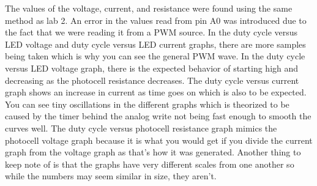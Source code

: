 \documentclass[12pt,titlepage]{article}
\begin{document}
The values of the voltage, current, and resistance were found using the same method as lab 2. An error in the values read from pin A0 was introduced due to
the fact that we were reading it from a PWM source. In the duty cycle versus LED voltage and duty cycle versus LED
current graphs, there are more samples being taken which is why you can see the general PWM wave. In the duty cycle versus LED voltage graph, there is the expected behavior of
starting high and decreasing as the photocell resistance decreases. The duty cycle versus current graph shows an increase in current as time goes on which is also to be expected.
You can see tiny oscillations in the different graphs which is theorized to be caused by the timer behind the analog write not being fast enough to smooth the curves well.
The duty cycle versus photocell resistance graph mimics the photocell voltage graph because it is what you would get if you divide the current graph from the voltage graph as that's
how it was generated. Another thing to keep note of is that the graphs have very different scales from one another so while the numbers may seem similar in size, they aren't.
\end{document}
